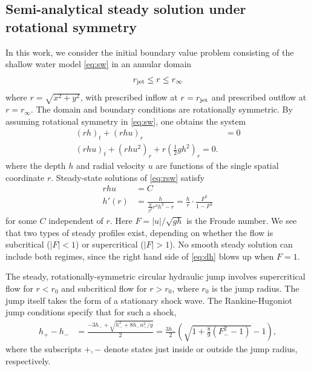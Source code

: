 \documentclass[preprint, 11pt]{article}
\begin{document}
\subsection{Semi-analytical steady solution under rotational symmetry}\label{sec:steady_chj}
In this work, we consider the initial boundary value problem consisting of the
shallow water model \eqref{eq:sw} in an annular domain
\begin{align}
r_\textup{jet} \le r \le r_\infty
\end{align}
where $r = \sqrt{x^2+y^2}$, with prescribed inflow at $r=r_\textup{jet}$
and prescribed outflow at $r=r_\infty$.
The domain and boundary conditions are rotationally symmetric.
By assuming rotational symmetry in \eqref{eq:sw}, one obtains the system
\begin{subequations} \label{eq:rsw}
\begin{align}
    (rh)_t + (rhu)_r & = 0 \label{mass1} \\
    (rhu)_t + (rhu^2)_r + r \left(\frac{1}{2}gh^2\right)_r = 0. \label{mom1}
\end{align}
\end{subequations}
where the depth $h$ and radial velocity $u$ are functions of the single spatial coordinate $r$.
Steady-state solutions of \eqref{eq:rsw} satisfy
\begin{subequations}\label{steady}
\begin{align}
    rhu & = C \\
    h'(r) & = \frac{h}{\frac{g}{\beta^2} r^3 h^3 -r} = \frac{h}{r} \cdot \frac{F^2}{1-F^2} \label{eq:dh}
\end{align}
\end{subequations}
for some $C$ independent of $r$.  Here $F=|u|/\sqrt{gh}$ is the Froude number.
We see that two types of steady profiles exist, depending on whether the flow
is subcritical ($|F|<1$) or supercritical ($|F|>1$).  No smooth steady solution can
include both regimes, since the right hand side of \eqref{eq:dh} blows up when $F=1$.

The steady, rotationally-symmetric circular hydraulic jump involves supercritical
flow for $r<r_0$ and subcritical flow for $r>r_0$, where $r_0$ is the jump radius.
The jump itself takes the form of a stationary shock wave.  The Rankine-Hugoniot jump
conditions specify that for such a shock,
\begin{align} \label{eq:RH}
    h_+ - h_- & = \frac{-3h_- + \sqrt{h_-^2 + 8 h_- u_-^2/g}}{2} = \frac{3h_-}{2}\left(\sqrt{1+\frac{8}{9}(F_-^2-1)}-1\right),
\end{align}
where the subscripts $+, -$ denote states just inside or outside the jump radius, respectively.
\end{document}
